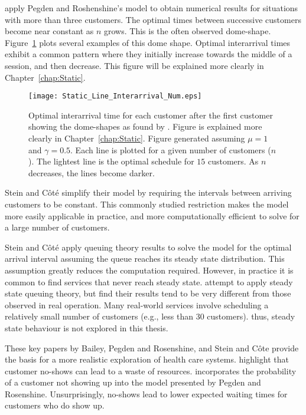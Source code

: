 \citet{Stein} apply Pegden and Roshenshine's model to obtain numerical results for situations with more than three customers. The optimal times between successive customers become near constant as $n$ grows. This is the often observed dome-shape. Figure~\ref{fig:Lit_Dome_Shape} plots several examples of this dome shape. Optimal interarrival times exhibit a common pattern where they initially increase towards the middle of a session, and then decrease. This figure will be explained more clearly in Chapter~\ref{chap:Static}.
\begin{figure}[htb]
	\centering
	\texttt{[image: Static\_Line\_Interarrival\_Num.eps]}
	\caption{Optimal interarrival time for each customer after the first customer showing the dome-shapes as found by \citet{Stein}. Figure is explained more clearly in Chapter~\ref{chap:Static}. Figure generated assuming $\mu = 1$ and $\gamma = 0.5$. Each line is plotted for a given number of customers ($n$). The lightest line is the optimal schedule for $15$ customers. As $n$ decreases, the lines become darker.}
	\label{fig:Lit_Dome_Shape}
\end{figure}

Stein and C\^{o}t\'{e} simplify their model by requiring the intervals between arriving customers to be constant. This commonly studied restriction makes the model more easily applicable in practice, and more computationally efficient to solve for a large number of customers.

Stein and C\^{o}t\'{e} apply queuing theory results to solve the model for the optimal arrival interval assuming the queue reaches its steady state distribution. This assumption greatly reduces the computation required. However, in practice it is common to find services that never reach steady state. \citet{Babes} attempt to apply steady state queuing theory, but find their results tend to be very different from those observed in real operation. Many real-world services involve scheduling a relatively small number of customers (e.g., less than 30 customers). thus, steady state behaviour is not explored in this thesis.

These key papers by Bailey, Pegden and Rosenshine, and Stein and C\^{o}te provide the basis for a more realistic exploration of health care systems. \citet{Delaurentis} highlight that customer no-shows can lead to a waste of resources. \citet{Mendel} incorporates the probability of a customer not showing up into the model presented by Pegden and Rosenshine. Unsurprisingly, no-shows lead to lower expected waiting times for customers who do show up.

